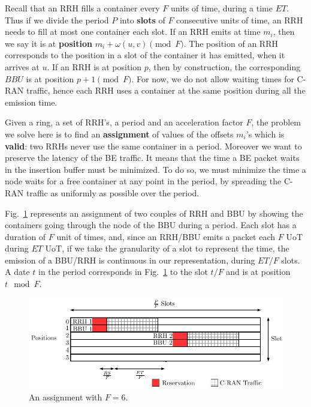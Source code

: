 \documentclass[10pt, conference, letterpaper]{IEEEtran}
\begin{document}
Recall that an RRH fills a container every $F$ units of time, during a time $ET$. 
Thus if we divide the period $P$ into \textbf{slots} of $F$ consecutive units of time, an RRH needs to fill at most one container each slot. If an RRH emits at time $m_i$, then we say it is at \textbf{position} $m_i + \omega(u,v)\pmod F$.
The position of an RRH corresponds to the position in a slot of the container it has emitted, when it arrives at $u$. 
If an RRH is at position $p$, then by construction, the corresponding $BBU$ is at position $p+1\pmod F$. For now, we do not allow waiting times for C-RAN traffic, hence each RRH uses a container at the same position during all the emission time. 

Given a ring, a set of RRH's, a period and an acceleration factor $F$, the problem we solve here is to find an \textbf{assignment} of values of the offsets $m_i$'s which is \textbf{valid}: two RRHs never use the same container in a period. Moreover we want to preserve the latency of the BE traffic. It means that the time a BE packet waits in the insertion buffer must be minimized. To do so, we must minimize the time a node waits for a free container at any point in the period, by spreading the C-RAN traffic as uniformly as possible over the period. %

Fig.~\ref{fig:assignment} represents an assignment of two couples of RRH and BBU by showing the containers going through the node of the BBU during a period. Each slot has a duration of $F$ unit of times, and, since an RRH/BBU emits a packet each $F$ UoT during $ET$ UoT, if we take the granularity of a slot to represent the time, the emission of a BBU/RRH is continuous in our representation, during $ET/F$ slots. A date $t$ in the period corresponds in Fig.~\ref{fig:assignment} to the slot $t/F$ and is at position $t \mod F$.


\begin{figure}[h!]
\begin{center}   

      \includegraphics[scale=0.65]{assignment}
     \caption{An assignment with $F = 6$.}\label{fig:assignment}
     
\end{center}
  \end{figure}
\end{document}
